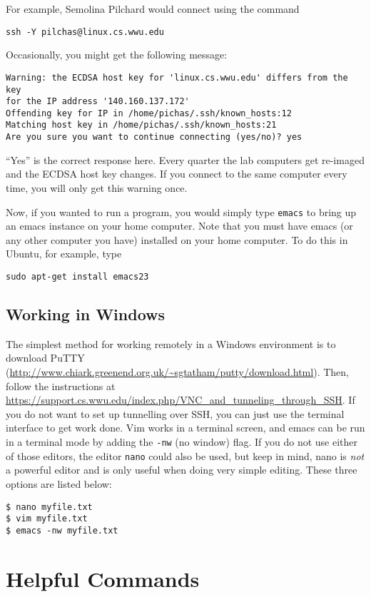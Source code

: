 \documentclass[12pt]{article}
\begin{document}
For example, Semolina Pilchard would connect using the command
\begin{verbatim}
ssh -Y pilchas@linux.cs.wwu.edu
\end{verbatim}

Occasionally, you might get the following message:
\begin{verbatim}
Warning: the ECDSA host key for 'linux.cs.wwu.edu' differs from the key
for the IP address '140.160.137.172'
Offending key for IP in /home/pichas/.ssh/known_hosts:12
Matching host key in /home/pichas/.ssh/known_hosts:21
Are you sure you want to continue connecting (yes/no)? yes
\end{verbatim}
``Yes'' is the correct response here. Every quarter the lab computers get re-imaged and the ECDSA host key changes. If you connect to the same computer every time, you will only get this warning once.

Now, if you wanted to run a program, you would simply type \verb|emacs| to bring up an emacs instance on your home computer. Note that you must have emacs (or any other computer you have) installed on your home computer. To do this in Ubuntu, for example, type
\begin{verbatim}
sudo apt-get install emacs23
\end{verbatim}

\subsection{Working in Windows}
The simplest method for working remotely in a Windows environment is to download PuTTY (\url{http://www.chiark.greenend.org.uk/~sgtatham/putty/download.html}). Then, follow the instructions at \url{https://support.cs.wwu.edu/index.php/VNC_and_tunneling_through_SSH}. If you do not want to set up tunnelling over SSH, you can just use the terminal interface to get work done. Vim works in a terminal screen, and emacs can be run in a terminal mode by adding the \verb|-nw| (no window) flag. If you do not use either of those editors, the editor \verb|nano| could also be used, but keep in mind, nano is \emph{not} a powerful editor and is only useful when doing very simple editing. These three options are listed below:
\begin{verbatim}
$ nano myfile.txt
$ vim myfile.txt
$ emacs -nw myfile.txt
\end{verbatim}
\section{Helpful Commands}
\end{document}
